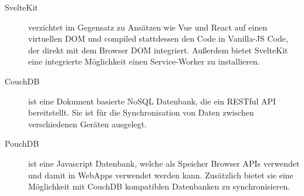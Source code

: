 \begin{description}
    \item[SvelteKit\cite{sveltekit}] verzichtet im Gegensatz zu Ansätzen wie Vue und React auf einen virtuellen DOM und compiled stattdessen den Code in Vanilla-JS Code, der direkt mit dem Browser DOM integriert.\cite{svelte} Außerdem bietet SvelteKit eine integrierte Möglichkeit einen Service-Worker zu installieren.\cite{sveltekit:serviceworker}
    \item[CouchDB\cite{couchdb}] ist eine Dokument basierte NoSQL Datenbank, die ein RESTful API bereitstellt. Sie ist für die Synchronisation von Daten zwischen verschiedenen Geräten ausgelegt.\cite{couchdb}\cite{couchdb:overview}
    \item[PouchDB\cite{pouchdb}] ist eine Javascript Datenbank, welche als Speicher Browser APIs verwendet und damit in WebApps verwendet werden kann. Zusätzlich bietet sie eine Möglichkeit mit CouchDB kompatiblen Datenbanken zu synchronisieren.\cite{pouchdb:about}
\end{description}
